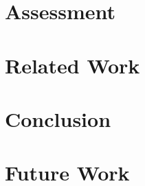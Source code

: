 \documentclass[11pt]{article}
\begin{document}
\begin{multicols}{2}

\section{Assessment}





\section{Related Work}



\section{Conclusion}



\section{Future Work}



\end{multicols}
\newpage




\end{document}
